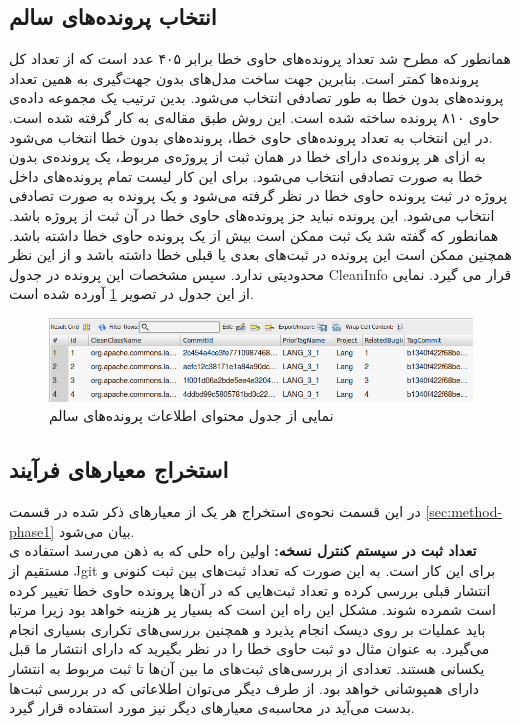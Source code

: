 \subsection{انتخاب پرونده‌های سالم}
همانطور که مطرح شد تعداد پرونده‌های حاوی خطا برابر ۴۰۵ عدد است که از تعداد کل پرونده‌ها کمتر است. بنابرین جهت ساخت مدل‌های بدون جهت‌گیری به همین تعداد پرونده‌های بدون خطا به طور تصادفی انتخاب می‌شود. بدین ترتیب یک مجموعه داده‌ی  حاوی ۸۱۰ پرونده ساخته شده است. این روش طبق مقاله‌ی \cite{johannessen2008data} به کار گرفته شده است. در این انتخاب به تعداد پرونده‌های حاوی خطا، پرونده‌های بدون خطا انتخاب می‌شود. \\به ازای هر پرونده‌ی دارای خطا در همان ثبت از پروژه‌ی مربوط، یک پرونده‌ی بدون خطا به صورت تصادفی انتخاب می‌شود. برای این کار لیست تمام پرونده‌های داخل پروژه در ثبت پرونده حاوی خطا در نظر گرفته می‌شود و یک پرونده به صورت تصادفی انتخاب می‌شود. این پرونده نباید جز پرونده‌های حاوی خطا در آن ثبت از  پروژه باشد.   همانطور که گفته شد یک ثبت ممکن است بیش از یک پرونده حاوی خطا داشته باشد. همچنین ممکن  است این پرونده در ثبت‌های بعدی یا قبلی خطا داشته باشد و از این نظر محدودیتی ندارد. سپس مشخصات این پرونده در جدول CleanInfo قرار می گیرد. نمایی از این جدول در تصویر \ref{fig:clean-info} آورده شده است.
\begin{figure}[H]
	\centering
	\includegraphics[width=1\textwidth]{img/case_study/clean-info.png}
	\caption{نمایی از جدول محتوای اطلاعات پرونده‌های سالم}
	\label{fig:clean-info}
\end{figure}



\subsection{ استخراج معیارهای فرآیند}
در  این قسمت نحوه‌ی استخراج هر یک از معیارهای ذکر شده در قسمت \ref{sec:method-phase1} بیان می‌شود. \\
\textbf{‫تعداد ثبت در سیستم کنترل نسخه‬:}
اولین راه حلی که به ذهن می‌رسد استفاده ی مستقیم از Jgit برای این کار است.  به این صورت که تعداد ثبت‌های بین ثبت کنونی و انتشار قبلی  بررسی کرده و تعداد  ثبت‌هایی که در آن‌ها پرونده حاوی خطا تغییر کرده است شمرده شوند. مشکل این راه این است که بسیار پر هزینه  خواهد بود زیرا مرتبا باید عملیات  بر روی دیسک انجام پذیرد و همچنین بررسی‌های تکراری بسیاری انجام می‌گیرد. به عنوان مثال دو ثبت حاوی خطا را در نظر بگیرید که دارای انتشار ما قبل یکسانی هستند. تعدادی از بررسی‌های ثبت‌های ما بین آن‌ها تا ثبت مربوط به انتشار دارای همپوشانی خواهد بود. از طرف دیگر می‌توان اطلاعاتی که در بررسی ثبت‌ها بدست می‌آید در محاسبه‌ی معیارهای دیگر نیز مورد استفاده قرار گیرد.\\

